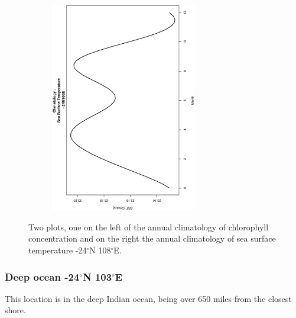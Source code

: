 \begin{figure}[ht]
\begin{subfigure}[t]{0.5\textwidth}
        \includegraphics[width=0.7\textwidth, angle =-90]{Chapter3/-24,108/Data_-24N108E_SST_Climatology.eps}
    \end{subfigure}
    \caption{Two plots, one on the left of the annual climatology of chlorophyll concentration and on the right the annual climatology of sea surface temperature -24$^{\circ}$N 108$^{\circ}$E.}\label{fig:clim-24,108}
\end{figure}

\subsubsection{Deep ocean -24$^{\circ}$N 103$^{\circ}$E}

This location is in the deep Indian ocean, being over 650 miles from the closest shore. 

